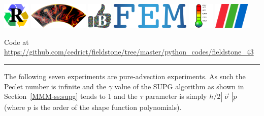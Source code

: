 \noindent
\includegraphics[height=1.25cm]{images/pictograms/replication}
\includegraphics[height=1.25cm]{images/pictograms/aspect_logo}
\includegraphics[height=1.25cm]{images/pictograms/benchmark}
\includegraphics[height=1.25cm]{images/pictograms/FEM}
\includegraphics[height=1.25cm]{images/pictograms/temperature}
\includegraphics[height=1.25cm]{images/pictograms/paraview}


%

\begin{center}
Code at \url{https://github.com/cedrict/fieldstone/tree/master/python_codes/fieldstone_43}
\end{center}

\par\noindent\rule{\textwidth}{0.4pt}

The following seven experiments are pure-advection experiments. As such the Peclet number
is infinite and the $\gamma$ value of the SUPG algorithm as shown in Section~\ref{MMM-ss:supg} tends to 1
and the $\tau$ parameter is simply $h/2 |\vec\upnu| p$ (where $p$ is the order of 
the shape function polynomials).

